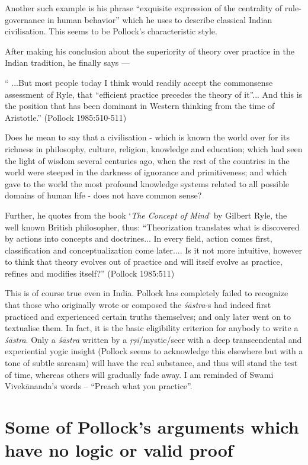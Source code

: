 Another such example is his phrase ``exquisite expression of the centrality of rule-governance in human behavior'' which he uses to describe classical Indian civilisation. This seems to be Pollock's characteristic style.

After making his conclusion about the superiority of theory over practice in the Indian tradition, he finally says ---
\begin{myquote}
`` ...But most people today I think would readily accept the commonsense assessment of Ryle, that ``efficient practice precedes the theory of it''... And this is the position that has been dominant in Western thinking from the time of Aristotle.'' (Pollock 1985:510-511)
\end{myquote}

Does he mean to say that a civilisation - which is known the world over for its richness in philosophy, culture, religion, knowledge and education; which had seen the light of wisdom several centuries ago, when the rest of the countries in the world were steeped in the darkness of ignorance and primitiveness; and which gave to the world the most profound knowledge systems related to all possible domains of human life - does not have common sense?

Further, he quotes from the book `{\sl The Concept of Mind}' by Gilbert Ryle, the well known British philosopher, thus: ``Theorization translates what is discovered by actions into concepts and doctrines... In every field, action comes first, classification and conceptualization come later.... Is it not more intuitive, however to think that theory evolves out of practice and will itself evolve as practice, refines and modifies itself?'' (Pollock 1985:511)

This is of course true even in India. Pollock has completely failed to recognize that those who originally wrote or composed the {\sl śāstra}-s had indeed first practiced and experienced certain truths themselves; and only later went on to textualise them. In fact, it is the basic eligibility criterion for anybody to write a {\sl śāstra}. Only a {\sl śāstra} written by a {\sl ṛṣi}/mystic/seer with a deep transcendental and experiential yogic insight (Pollock seems to acknowledge this elsewhere but with a tone of subtle sarcasm) will have the real substance, and thus will stand the test of time, whereas others will gradually fade away. I am reminded of Swami Vivekānanda's words -- ``Preach what you practice''.

\section*{Some of Pollock's arguments which have no logic or valid proof}


